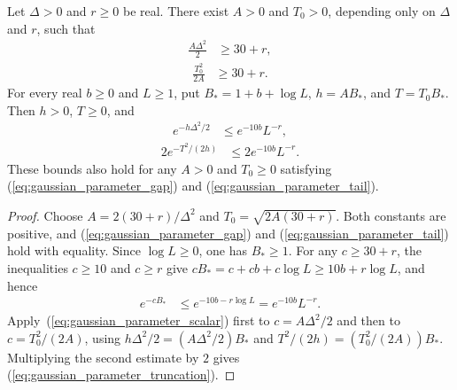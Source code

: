 \begin{theorem}
    \label{thm:gaussian_parameters}
    \leanok
    Let $\Delta>0$ and $r\ge0$ be real. There exist $A>0$ and $T_0>0$,
    depending only on $\Delta$ and $r$, such that
    \begin{align}
        \frac{A\Delta^2}{2}&\ge 30+r,
        \label{eq:gaussian_parameter_gap}
    \end{align}
    \begin{align}
        \frac{T_0^2}{2A}&\ge 30+r.
        \label{eq:gaussian_parameter_tail}
    \end{align}
    For every real $b\ge0$ and $L\ge1$, put
    $B_*=1+b+\log L$, $h=AB_*$, and $T=T_0B_*$.
    Then $h>0$, $T\ge0$, and
    \begin{align}
        e^{-h\Delta^2/2}&\le e^{-10b}L^{-r},
        \label{eq:gaussian_parameter_error}
    \end{align}
    \begin{align}
        2e^{-T^2/(2h)}&\le 2e^{-10b}L^{-r}.
        \label{eq:gaussian_parameter_truncation}
    \end{align}
    These bounds also hold for any $A>0$ and $T_0\ge0$ satisfying
    (\ref{eq:gaussian_parameter_gap}) and (\ref{eq:gaussian_parameter_tail}).
\end{theorem}
\begin{proof}\leanok
    Choose $A=2(30+r)/\Delta^2$ and
    $T_0=\sqrt{2A(30+r)}$. Both constants are positive, and
    (\ref{eq:gaussian_parameter_gap}) and
    (\ref{eq:gaussian_parameter_tail}) hold with equality.
    Since $\log L\ge0$, one has $B_*\ge1$.
    For any $c\ge30+r$, the inequalities $c\ge10$ and $c\ge r$ give
    $cB_*=c+cb+c\log L\ge10b+r\log L$, and hence
    \begin{align}
        e^{-cB_*}&\le e^{-10b-r\log L}=e^{-10b}L^{-r}.
        \label{eq:gaussian_parameter_scalar}
    \end{align}
    Apply~(\ref{eq:gaussian_parameter_scalar}) first to
    $c=A\Delta^2/2$ and then to $c=T_0^2/(2A)$, using
    $h\Delta^2/2=(A\Delta^2/2)B_*$ and
    $T^2/(2h)=(T_0^2/(2A))B_*$.
    Multiplying the second estimate by $2$ gives
    (\ref{eq:gaussian_parameter_truncation}).
\end{proof}

